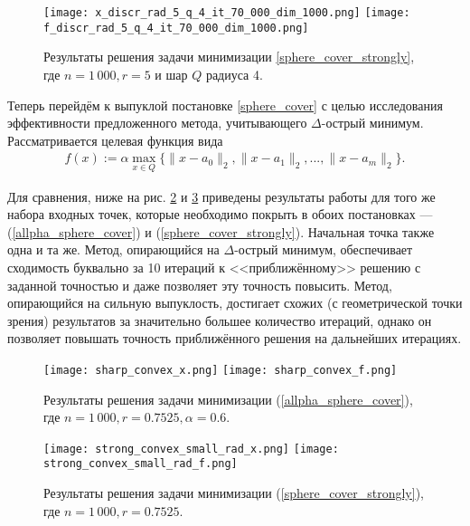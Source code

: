 \begin{figure}[h]
    \texttt{[image: x\_discr\_rad\_5\_q\_4\_it\_70\_000\_dim\_1000.png]}
    \endminipage\hfill
    \texttt{[image: f\_discr\_rad\_5\_q\_4\_it\_70\_000\_dim\_1000.png]}
    \endminipage\hfill
    \caption{Результаты решения задачи минимизации \eqref{sphere_cover_strongly}, где  $n= 1\,000, r = 5$ и  шар $Q$ радиуса 4.}
    \label{res_ex_strong_r5}
\end{figure}

Теперь перейдём к выпуклой постановке \eqref{sphere_cover} с целью исследования эффективности предложенного метода, учитывающего $\Delta$-острый минимум. Рассматривается целевая функция вида
\begin{gather}\label{allpha_sphere_cover}
    f(x) := \alpha \max_{x\in Q}\{\|x - a_0\|_2, \|x - a_1\|_2, ..., \|x - a_m\|_2\}.
\end{gather}

Для сравнения, ниже на рис. \ref{res_sharp_convex} и \ref{res_strong_convex} приведены результаты работы для того же набора входных точек, которые необходимо покрыть в обоих постановках --- (\ref{allpha_sphere_cover}) и (\ref{sphere_cover_strongly}). Начальная точка также одна и та же. Метод, опирающийся на $\Delta$-острый минимум, обеспечивает сходимость буквально за 10 итераций к <<приближённому>> решению с заданной точностью и даже позволяет эту точность повысить. Метод, опирающийся на сильную выпуклость, достигает схожих (с геометрической точки зрения) результатов за значительно большее количество итераций, однако он позволяет повышать точность приближённого решения на дальнейших итерациях.

\begin{figure}[h]
    \texttt{[image: sharp\_convex\_x.png]}
    \endminipage\hfill
    \texttt{[image: sharp\_convex\_f.png]}
    \endminipage\hfill
    \caption{ Результаты решения задачи минимизации (\ref{allpha_sphere_cover}), где  $n= 1\,000, r = 0.7525, \alpha = 0.6$.}
    \label{res_sharp_convex}
\end{figure}

\begin{figure}[h]
    \texttt{[image: strong\_convex\_small\_rad\_x.png]}
    \endminipage\hfill
    \texttt{[image: strong\_convex\_small\_rad\_f.png]}
    \endminipage\hfill
    \caption{ Результаты решения задачи минимизации (\ref{sphere_cover_strongly}), где  $n= 1\,000, r = 0.7525$.}
    \label{res_strong_convex}
\end{figure}

